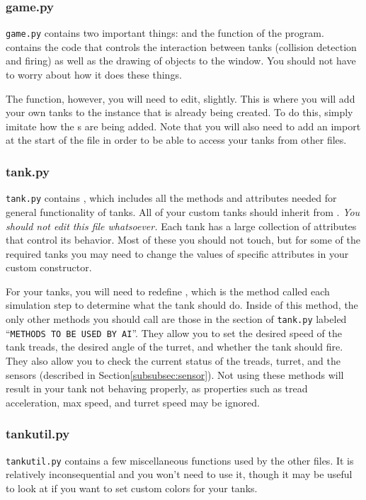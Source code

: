 \documentclass[11pt]{cselabheader}
\begin{document}
\subsubsection{game.py}
\texttt{game.py} contains two important things:  and
the  function of the program. 
contains the code that controls the interaction between tanks (collision
detection and firing) as well as the drawing of objects to the
 window. You should not have to worry about how it does
these things.

The  function, however, you will need to edit, slightly.
This is where you will add your own tanks to the  instance
that is already being created. To do this, simply imitate how the
s are being added. Note that you will also need to add
an import at the start of the file in order to be able to access your tanks from
other files.

\subsubsection{tank.py}
\texttt{tank.py} contains , which includes all the
methods and attributes needed for general functionality of tanks. All of your
custom tanks should inherit from . \emph{You should not edit
this file whatsoever.} Each tank has a large collection of attributes that
control its behavior. Most of these you should not touch, but for some of the
required tanks you may need to change the values of specific attributes in
your custom constructor.

For your tanks, you will need to redefine
, which is the method called each simulation step
to determine what the tank should do. Inside of this method, the only other
methods you should call are those in the section of \texttt{tank.py} labeled
``\texttt{METHODS TO BE USED BY AI}''. They allow you to set the desired speed
of the tank treads, the desired angle of the turret, and whether the tank should
fire. They also allow you to check the current status of the treads, turret, and
the sensors (described in Section\ref{subsubsec:sensor}). Not using these
methods will result in your tank not behaving properly, as properties such as
tread acceleration, max speed, and turret speed may be ignored.

\subsubsection{tankutil.py}
\texttt{tankutil.py} contains a few miscellaneous functions used by the other
files. It is relatively inconsequential and you won't need to use it, though it
may be useful to look at if you want to set custom colors for your tanks.
\end{document}
